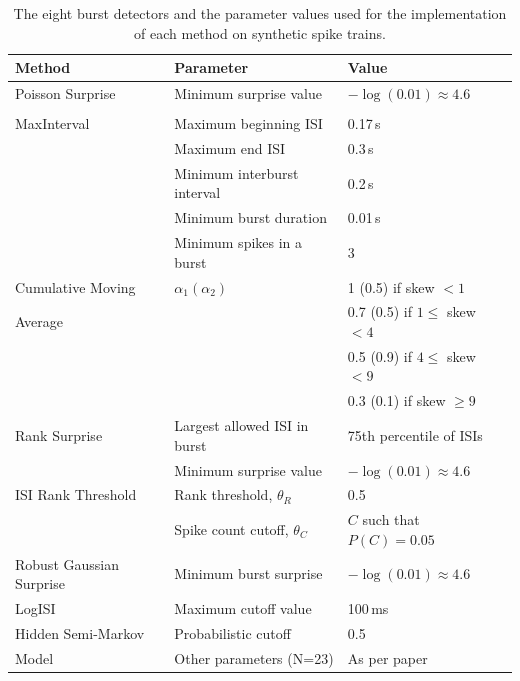 \documentclass[12pt, titlepage]{article}
\begin{document}
	\begin{table}[h]
		\centering
		\begin{tabular}{|p{5cm}|l|l|}
			\hline
			Method & Parameter & Value
			\\ \hline \rowcolor{Gray}
			Poisson Surprise & Minimum surprise value & $-\log(0.01) \approx 4.6$
			\\
			\rowcolor{Gray} \cite{Legendy1985}&&\\ 
			 \hline
			MaxInterval  & Maximum beginning ISI & 0.17$\,$s
			\\ \cite{NEmanual} & Maximum end ISI & 0.3$\,$s
			\\ & Minimum interburst interval & 0.2$\,$s
			\\ & Minimum burst duration & 0.01$\,$s
			\\& Minimum spikes in a burst & 3
			\\ \hline 
			\rowcolor{Gray} Cumulative Moving & $\alpha_1 (\alpha_2)$ & 1 (0.5) if skew $<1$
			\\ \rowcolor{Gray} Average & &  0.7 (0.5) if $1 \leq $ skew $<4$
			\\ \rowcolor{Gray} & & 0.5 (0.9) if $4 \leq $ skew $<9$
			\\ \rowcolor{Gray} & & 0.3 (0.1) if  skew $\geq 9$
			\\ \hline 
				 Rank Surprise& Largest allowed ISI in burst & 75th percentile of ISIs\\
				\cite{Gourevitch2007} & Minimum surprise value& $-\log(0.01) \approx 4.6$
				\\ \hline 
					\rowcolor{Gray}	ISI Rank Threshold  & Rank threshold, $\theta_R$ & 0.5 \\
					\rowcolor{Gray}\cite{Hennig2011} & Spike count cutoff, $\theta_C$& $C$ such that $P(C)=0.05 $
					\\ \hline
					Robust Gaussian Surprise \cite{Ko2012} & Minimum burst surprise & $-\log(0.01) \approx 4.6$
				\\ \hline \rowcolor{Gray}   LogISI \cite{Pasquale2010} & Maximum cutoff value & 100$\,$ms
			\\ \hline
			 Hidden Semi-Markov  & Probabilistic cutoff & 0.5
			\\  Model \cite{Tokdar2010}& Other parameters (N=23) & As per paper 
			\\ \hline
		\end{tabular}
		\caption{The eight burst detectors and the parameter values used for the implementation of each method on synthetic spike trains.}
		\label{param_vals}
	\end{table}
\end{document}
